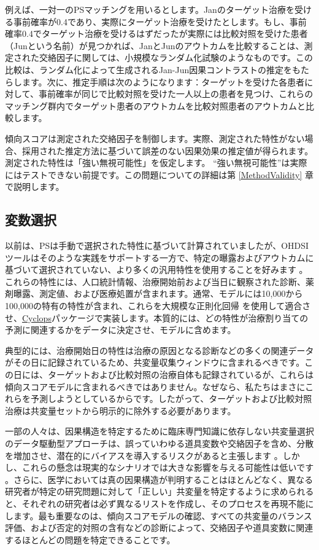\documentclass[
  11pt]{book}
\makeatletter
\newenvironment{kframe}{%
\medskip{}
\setlength{\fboxsep}{.8em}
 \def\at@end@of@kframe{}%
 \ifinner\ifhmode%
  \def\at@end@of@kframe{\end{minipage}}%
  \begin{minipage}{\columnwidth}%
 \fi\fi%
 \def\FrameCommand##1{\hskip\@totalleftmargin \hskip-\fboxsep
 \colorbox{myShadeColor}{##1}\hskip-\fboxsep
     \hskip-\linewidth \hskip-\@totalleftmargin \hskip\columnwidth}%
 \MakeFramed {\advance\hsize-\width
   \@totalleftmargin\z@ \linewidth\hsize
   \@setminipage}}%
 {\par\unskip\endMakeFramed%
 \at@end@of@kframe}
\newenvironment{rmdblock}[1]
  {
  \begin{itemize}
  \renewcommand{\labelitemi}{
    \raisebox{-.7\height}[0pt][0pt]{
      {\setkeys{Gin}{width=3em,keepaspectratio}\texttt{[image: images/\#1]}}
    }
  }
  \setlength{\fboxsep}{1em}
  \begin{kframe}
  \item
  }
  {
  \end{kframe}
  \end{itemize}
  }
\newenvironment{rmdimportant}
  {\begin{rmdblock}{important}}
  {\end{rmdblock}}
\theoremstyle{definition}
\theoremstyle{definition}
\theoremstyle{definition}
\theoremstyle{definition}
\theoremstyle{remark}
\makeatother
\begin{document}
例えば、一対一のPSマッチングを用いるとします。Janのターゲット治療を受ける事前確率が0.4であり、実際にターゲット治療を受けたとします。もし、事前確率0.4でターゲット治療を受けるはずだったが実際には比較対照を受けた患者（Junという名前）が見つかれば、JanとJunのアウトカムを比較することは、測定された交絡因子に関しては、小規模なランダム化試験のようなものです。この比較は、ランダム化によって生成されるJan-Jun因果コントラストの推定をもたらします。次に、推定手順は次のようになります：ターゲットを受けた各患者に対して、事前確率が同じで比較対照を受けた一人以上の患者を見つけ、これらのマッチング群内でターゲット患者のアウトカムを比較対照患者のアウトカムと比較します。

傾向スコアは測定された交絡因子を制御します。実際、測定された特性がない場合、採用された推定方法に基づいて誤差のない因果効果の推定値が得られます。測定された特性は「強い無視可能性」を仮定します。 ``強い無視可能性''は実際にはテストできない前提です。この問題についての詳細は第 \ref{MethodValidity} 章で説明します。 

\subsection{変数選択}\label{VariableSelection}

以前は、PSは手動で選択された特性に基づいて計算されていましたが、OHDSIツールはそのような実践をサポートする一方で、特定の曝露およびアウトカムに基づいて選択されていない、より多くの汎用特性を使用することを好みます \citep{tian_2018} 。これらの特性には、人口統計情報、治療開始前および当日に観察された診断、薬剤曝露、測定値、および医療処置が含まれます。通常、モデルには10,000から100,000の特有の特性が含まれ、これらを大規模な正則化回帰 \citep{suchard_2013} を使用して適合させ、\href{https://ohdsi.github.io/Cyclops/}{Cyclops}パッケージで実装します。本質的には、どの特性が治療割り当ての予測に関連するかをデータに決定させ、モデルに含めます。

\begin{rmdimportant}
典型的には、治療開始日の特性は治療の原因となる診断などの多くの関連データがその日に記録されているため、共変量収集ウィンドウに含まれるべきです。この日には、ターゲットおよび比較対照の治療自体も記録されているが、これらは傾向スコアモデルに含まれるべきではありません。なぜなら、私たちはまさにこれらを予測しようとしているからです。したがって、ターゲットおよび比較対照治療は共変量セットから明示的に除外する必要があります。
\end{rmdimportant}

一部の人々は、因果構造を特定するために臨床専門知識に依存しない共変量選択のデータ駆動型アプローチは、誤っていわゆる道具変数や交絡因子を含め、分散を増加させ、潜在的にバイアスを導入するリスクがあると主張します \citep{hernan_2002}。しかし、これらの懸念は現実的なシナリオでは大きな影響を与える可能性は低いです \citep{schneeweiss_2018}。さらに、医学においては真の因果構造が判明することはほとんどなく、異なる研究者が特定の研究問題に対して「正しい」共変量を特定するように求められると、それぞれの研究者は必ず異なるリストを作成し、そのプロセスを再現不能にします。最も重要なのは、傾向スコアモデルの確認、すべての共変量のバランス評価、および否定的対照の含有などの診断によって、交絡因子や道具変数に関連するほとんどの問題を特定できることです。  
\end{document}
